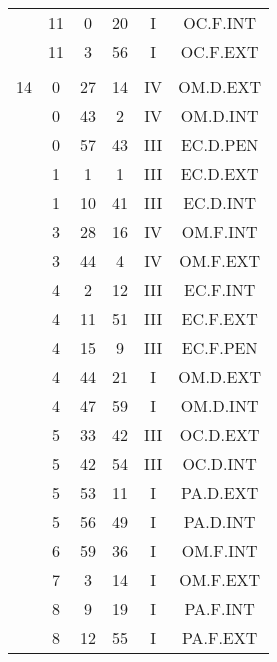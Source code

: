 \documentclass[12pt, a4paper]{article}
\begin{document}
\begin{multicols}{3}
{\begin{tabular}{c c c c c c}
	 	 	 	 & 11 & 0 & 20 & I & OC.F.INT\\%
	 	 	 	 & 11 & 3 & 56 & I & OC.F.EXT\\%
	 	 	 	 & & & & & \\%
	 	 	 	14 & 0 & 27 & 14 & IV & OM.D.EXT\\%
	 	 	 	 & 0 & 43 & 2 & IV & OM.D.INT\\%
	 	 	 	 & 0 & 57 & 43 & III & EC.D.PEN\\%
	 	 	 	 & 1 & 1 & 1 & III & EC.D.EXT\\%
	 	 	 	 & 1 & 10 & 41 & III & EC.D.INT\\%
	 	 	 	 & 3 & 28 & 16 & IV & OM.F.INT\\%
	 	 	 	 & 3 & 44 & 4 & IV & OM.F.EXT\\%
	 	 	 	 & 4 & 2 & 12 & III & EC.F.INT\\%
	 	 	 	 & 4 & 11 & 51 & III & EC.F.EXT\\%
	 	 	 	 & 4 & 15 & 9 & III & EC.F.PEN\\%
	 	 	 	 & 4 & 44 & 21 & I & OM.D.EXT\\%
	 	 	 	 & 4 & 47 & 59 & I & OM.D.INT\\%
	 	 	 	 & 5 & 33 & 42 & III & OC.D.EXT\\%
	 	 	 	 & 5 & 42 & 54 & III & OC.D.INT\\%
	 	 	 	 & 5 & 53 & 11 & I & PA.D.EXT\\%
	 	 	 	 & 5 & 56 & 49 & I & PA.D.INT\\%
	 	 	 	 & 6 & 59 & 36 & I & OM.F.INT\\%
	 	 	 	 & 7 & 3 & 14 & I & OM.F.EXT\\%
	 	 	 	 & 8 & 9 & 19 & I & PA.F.INT\\%
	 	 	 	 & 8 & 12 & 55 & I & PA.F.EXT\\%

\end{tabular}}
\end{multicols}
\end{document}
